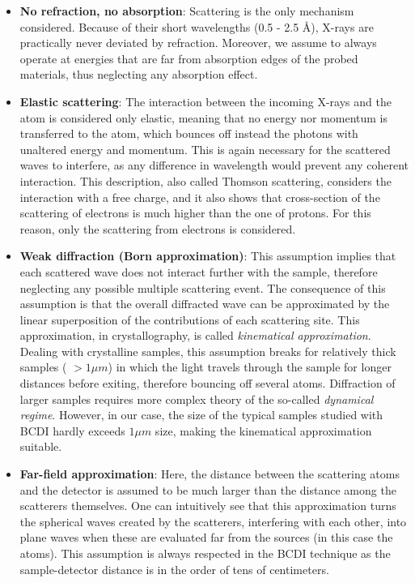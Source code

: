 \begin{itemize}
    \item \textbf{No refraction, no absorption}: Scattering is the only mechanism considered. Because of their short wavelengths
    (0.5 - 2.5 \AA), X-rays are practically never deviated by refraction. Moreover, we assume to always operate at energies that 
    are far from absorption edges of the probed materials, thus neglecting any absorption effect. 
    \item \textbf{Elastic scattering}: The interaction between the incoming X-rays and the atom is considered only elastic, meaning that 
    no energy nor momentum is transferred to the atom, which bounces off instead the photons with unaltered energy and 
    momentum. This is again necessary for the scattered waves to interfere, as any difference in wavelength would 
    prevent any coherent interaction. This description, also called Thomson scattering, considers the interaction with a free charge, 
    and it also shows that cross-section of the scattering of electrons is much higher than the one of protons. 
    For this reason, only the scattering from electrons is considered. 
    \item \textbf{Weak diffraction (Born approximation)}: This assumption implies that each scattered wave does not interact 
    further with the sample, therefore neglecting any possible multiple scattering event. The consequence of this assumption 
    is that the overall diffracted wave can be approximated by the linear superposition of the contributions of each scattering site. 
    This approximation, in crystallography, is called \textit{kinematical approximation}. 
    Dealing with crystalline samples, this assumption breaks for relatively thick samples ( $ > 1 \mu m $) in which the 
    light travels through the sample for longer distances before exiting, therefore bouncing off several atoms. 
    Diffraction of larger samples requires more complex theory of the so-called \textit{dynamical regime}.
    However, in our case, the size of the typical samples studied with BCDI hardly exceeds $ 1 \mu m $ size, making the 
    kinematical approximation suitable. 
    \item \textbf{Far-field approximation}: Here, the distance between the scattering atoms and the detector is assumed 
    to be much larger than the distance among the scatterers themselves. One can intuitively see that this approximation 
    turns the spherical waves created by the scatterers, interfering with each other, into plane waves when these are evaluated 
    far from the sources (in this case the atoms). This assumption is always respected in the BCDI 
    technique as the sample-detector distance is in the order of tens of centimeters.


\end{itemize}

